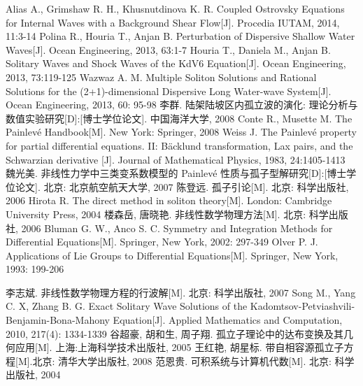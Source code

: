 \begin{thebibliography}{0}
 Alias A., Grimshaw R. H., Khusnutdinova K. R. Coupled Ostrovsky Equations for Internal Waves with a Background Shear Flow[J]. Procedia IUTAM, 2014, 11:3-14
 Polina R., Houria T., Anjan B.  Perturbation of Dispersive Shallow Water Waves[J]. Ocean Engineering, 2013, 63:1-7
Houria T., Daniela M., Anjan B. Solitary Waves and Shock Waves of the KdV6 Equation[J]. Ocean Engineering, 2013, 73:119-125
 Wazwaz A. M. Multiple Soliton Solutions and Rational Solutions for the (2+1)-dimensional Dispersive Long Water-wave System[J]. Ocean Engineering, 2013, 60: 95-98
 李群. 陆架陆坡区内孤立波的演化: 理论分析与数值实验研究[D]:[博士学位论文]. 中国海洋大学, 2008
 Conte R., Musette M. The Painlev\'{e} Handbook[M]. New York: Springer, 2008
 Weiss J. The Painlev\'{e} property for partial differential equations. II: B\"{a}cklund transformation, Lax pairs, and the Schwarzian derivative [J]. Journal of Mathematical Physics, 1983, 24:1405-1413
 魏光美. 非线性力学中三类变系数模型的 Painlev\'{e} 性质与孤子型解研究[D]:[博士学位论文]. 北京: 北京航空航天大学, 2007
 陈登远. 孤子引论[M]. 北京: 科学出版社, 2006
 Hirota R. The direct method in soliton theory[M]. London: Cambridge University Press, 2004%
 楼森岳, 唐晓艳. 非线性数学物理方法[M]. 北京: 科学出版社, 2006
 Bluman G. W., Anco S. C. Symmetry and Integration Methods for Differential Equations[M]. Springer, New York, 2002: 297-349
 Olver P. J. Applications of Lie Groups to Differential Equations[M]. Springer, New York, 1993: 199-206

 李志斌. 非线性数学物理方程的行波解[M]. 北京: 科学出版社, 2007
 Song M., Yang C. X, Zhang B. G. Exact Solitary Wave Solutions of the  Kadomtsov-Petviashvili-Benjamin-Bona-Mahony Equation[J]. Applied Mathematics and Computation, 2010, 217(4): 1334-1339
 谷超豪, 胡和生, 周子翔. 孤立子理论中的达布变换及其几何应用[M]. 上海:上海科学技术出版社, 2005
 王红艳, 胡星标. 带自相容源孤立子方程[M].北京: 清华大学出版社, 2008
 范恩贵. 可积系统与计算机代数[M]. 北京: 科学出版社, 2004



\end{thebibliography}
